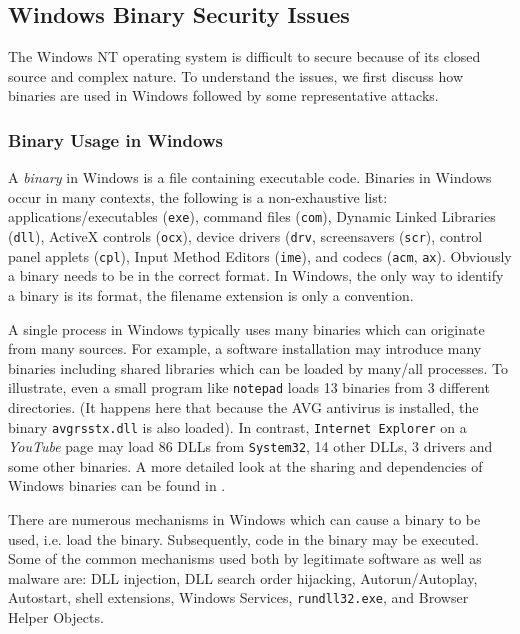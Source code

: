 \subsection{Windows Binary Security Issues}
\label{sec:problems}

The Windows NT operating system
is difficult to secure
because of its closed source and complex nature.
To understand the issues, we first discuss how
binaries are used in Windows followed
by some representative attacks.

\subsubsection{Binary Usage in Windows}

A {\em binary} in Windows is a file containing executable code.
Binaries in Windows occur in many contexts,
the following is a non-exhaustive list:
applications/executables ({\tt exe}),
command files ({\tt com}),
Dynamic Linked Libraries ({\tt dll}),
ActiveX controls ({\tt ocx}),
device drivers ({\tt drv},
screensavers ({\tt scr}),
control panel applets ({\tt cpl}),
Input Method Editors ({\tt ime}),
and codecs ({\tt acm}, {\tt ax}).
Obviously a binary needs to be in the correct format.
In Windows, the only way to identify a binary
is its format, the filename extension is only a convention.

A single process in Windows typically uses many binaries which
can originate from many sources.
For example, a software installation may introduce many binaries including
shared libraries which can be loaded by many/all processes.
To illustrate, even a small program like {\tt notepad}
loads 13 binaries from 3 different directories.
(It happens here that because the AVG antivirus is installed, the
binary {\tt avgrsstx.dll} is also loaded).
In contrast, {\tt Internet Explorer} on a {\em YouTube} page may load
86 DLLs from {\tt System32}, 14 other DLLs, 3 drivers and some other
binaries.
A more detailed look at the sharing and dependencies of Windows binaries
can be found in \cite{wu2010comprehending}.

There are numerous mechanisms in Windows which can cause a binary to be used,
i.e. load the binary.
Subsequently, code in the binary may be executed.
Some of the common mechanisms used both by legitimate software
as well as malware are:
DLL injection, DLL search order hijacking, Autorun/Autoplay, Autostart,
shell extensions, Windows Services, {\tt rundll\linebreak[0]32.exe},
and Browser Helper Objects.


